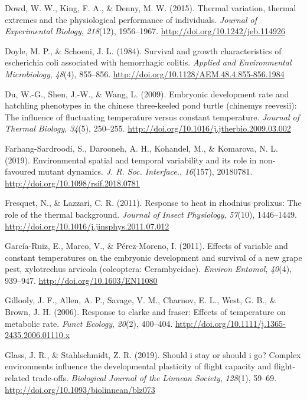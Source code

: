 \documentclass[12pt,twoside]{reedthesis}
\begin{document}
\leavevmode\hypertarget{ref-dowd_thermal_2015}{}%
Dowd, W. W., King, F. A., \& Denny, M. W. (2015). Thermal variation, thermal extremes and the physiological performance of individuals. \emph{Journal of Experimental Biology}, \emph{218}(12), 1956--1967. \url{http://doi.org/10.1242/jeb.114926}

\leavevmode\hypertarget{ref-doyle_survival_1984}{}%
Doyle, M. P., \& Schoeni, J. L. (1984). Survival and growth characteristics of escherichia coli associated with hemorrhagic colitis. \emph{Applied and Environmental Microbiology}, \emph{48}(4), 855--856. \url{http://doi.org/10.1128/AEM.48.4.855-856.1984}

\leavevmode\hypertarget{ref-du_embryonic_2009}{}%
Du, W.-G., Shen, J.-W., \& Wang, L. (2009). Embryonic development rate and hatchling phenotypes in the chinese three-keeled pond turtle (chinemys reevesii): The influence of fluctuating temperature versus constant temperature. \emph{Journal of Thermal Biology}, \emph{34}(5), 250--255. \url{http://doi.org/10.1016/j.jtherbio.2009.03.002}

\leavevmode\hypertarget{ref-farhang-sardroodi_environmental_2019}{}%
Farhang-Sardroodi, S., Darooneh, A. H., Kohandel, M., \& Komarova, N. L. (2019). Environmental spatial and temporal variability and its role in non-favoured mutant dynamics. \emph{J. R. Soc. Interface.}, \emph{16}(157), 20180781. \url{http://doi.org/10.1098/rsif.2018.0781}

\leavevmode\hypertarget{ref-fresquet_response_2011}{}%
Fresquet, N., \& Lazzari, C. R. (2011). Response to heat in rhodnius prolixus: The role of the thermal background. \emph{Journal of Insect Physiology}, \emph{57}(10), 1446--1449. \url{http://doi.org/10.1016/j.jinsphys.2011.07.012}

\leavevmode\hypertarget{ref-garcia-ruiz_effects_2011}{}%
García-Ruiz, E., Marco, V., \& Pérez-Moreno, I. (2011). Effects of variable and constant temperatures on the embryonic development and survival of a new grape pest, xylotrechus arvicola (coleoptera: Cerambycidae). \emph{Environ Entomol}, \emph{40}(4), 939--947. \url{http://doi.org/10.1603/EN11080}

\leavevmode\hypertarget{ref-gillooly_response_2006}{}%
Gillooly, J. F., Allen, A. P., Savage, V. M., Charnov, E. L., West, G. B., \& Brown, J. H. (2006). Response to clarke and fraser: Effects of temperature on metabolic rate. \emph{Funct Ecology}, \emph{20}(2), 400--404. \url{http://doi.org/10.1111/j.1365-2435.2006.01110.x}

\leavevmode\hypertarget{ref-glass_should_2019}{}%
Glass, J. R., \& Stahlschmidt, Z. R. (2019). Should i stay or should i go? Complex environments influence the developmental plasticity of flight capacity and flight-related trade-offs. \emph{Biological Journal of the Linnean Society}, \emph{128}(1), 59--69. \url{http://doi.org/10.1093/biolinnean/blz073}
\end{document}
